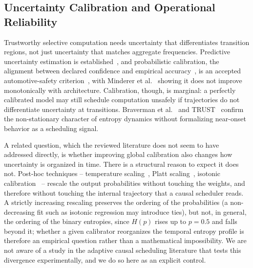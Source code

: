 \documentclass[a4paper,fleqn]{cas-dc}
\begin{document}
\subsection{Uncertainty Calibration and Operational Reliability}
\label{sec:rel_uncertainty}
Trustworthy selective computation needs uncertainty that differentiates transition regions, not just uncertainty that matches aggregate frequencies. Predictive uncertainty estimation is established~\cite{gal2016dropout,lakshminarayanan2017simple,hein2019relu}, and probabilistic calibration, the alignment between declared confidence and empirical accuracy~\cite{guo2017calibration}, is an accepted automotive-safety criterion~\cite{tang2022uv,michelmore2020uq}, with Minderer et al.~\cite{minderer2021revisiting} showing it does not improve monotonically with architecture. Calibration, though, is marginal: a perfectly calibrated model may still schedule computation unsafely if trajectories do not differentiate uncertainty at transitions. Braverman et al.~\cite{braverman2020calib} and TRUST~\cite{dera2023trust} confirm the non-stationary character of entropy dynamics without formalizing near-onset behavior as a scheduling signal.

A related question, which the reviewed literature does not seem to have addressed
directly, is whether improving global calibration also changes how uncertainty is
organized in time. There is a structural reason to expect it does not. Post-hoc
techniques -- temperature scaling~\cite{guo2017calibration}, Platt
scaling~\cite{platt1999probabilistic}, isotonic
calibration~\cite{zadrozny2002isotonic} -- rescale the output probabilities without
touching the weights, and therefore without touching the internal trajectory that a
causal scheduler reads. {\color{\revcolor}A strictly increasing rescaling preserves the ordering of
the probabilities (a non-decreasing fit such as isotonic regression may
introduce ties), but not, in general, the ordering of the binary entropies,
since $H(p)$ rises up to $p=0.5$ and falls beyond it; whether a given
calibrator reorganizes the temporal entropy profile is therefore an
empirical question rather than a mathematical impossibility.} We are
not aware of a study in the adaptive causal scheduling literature that tests this
divergence experimentally, and we do so here as an explicit control.
\end{document}
